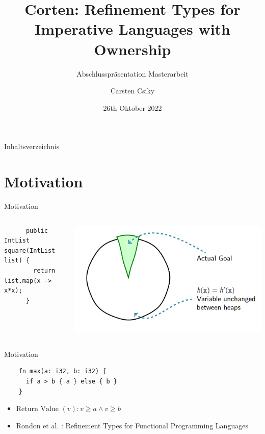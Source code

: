 \documentclass{sdqbeamer}
\title[Rust \& Refinement Types]{Corten: Refinement Types for Imperative Languages with Ownership}
\subtitle{Abschlusspräsentation Masterarbeit}
\author[Carsten Csiky]{Carsten Csiky}
\date[26.\,10.\,2022]{26th Oktober 2022}
\begin{document}
 
\KITtitleframe

\begin{frame}{Inhaltsverzeichnis}
\tableofcontents
\end{frame}

\section{Motivation}


\begin{frame}[fragile]{Motivation}{}
  \begin{columns}
    \begin{verbatim}
      public IntList square(IntList list) {
        return list.map(x -> x*x);
      }
    \end{verbatim}

    \includegraphics[width=1\textwidth]{../ratio-xkcd.png}
  \end{columns}
\end{frame}

\begin{frame}[fragile]{Motivation}{}
 \begin{verbatim}
    fn max(a: i32, b: i32) {
      if a > b { a } else { b }
    }
 \end{verbatim}
 \begin{itemize}
  \item<2-> $\text{Return Value }(v): v \geq a \wedge v \geq b$
  \item<3-> Rondon et al. \cite{rondon_liquid_2008}: Refinement Types for Functional Programming Languages
 \end{itemize}
\end{frame}
\end{document}
